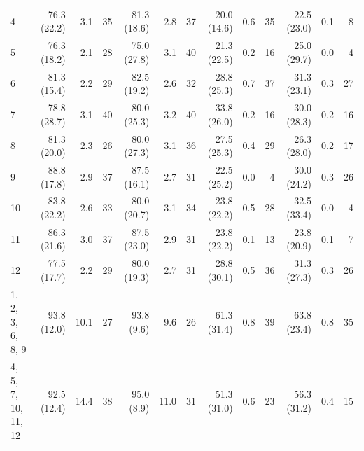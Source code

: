 \begin{table}[bt]
{\begin{tabular}{l|rrr|rrr|rrr|rrr}
        4 & 76.3 (22.2) & 3.1 & 35 &
        81.3 (18.6) & 2.8 & 37 &
        20.0 (14.6) & 0.6 & 35 &
        22.5 (23.0) & 0.1 & 8 \\
        
        5 & 76.3 (18.2) & 2.1 & 28 &
        75.0 (27.8) & 3.1 & 40 &
        21.3 (22.5) & 0.2 & 16 &
        25.0 (29.7) & 0.0 & 4 \\
        
        6 & 81.3 (15.4) & 2.2 & 29 &
        82.5 (19.2) & 2.6 & 32 &
        28.8 (25.3) & 0.7 & 37 &
        31.3 (23.1) & 0.3 & 27 \\
        
        7 & 78.8 (28.7) & 3.1 & 40 &
        80.0 (25.3) & 3.2 & 40 &
        33.8 (26.0) & 0.2 & 16 &
        30.0 (28.3) & 0.2 & 16 \\
        
        8 & 81.3 (20.0) & 2.3 & 26 &
        80.0 (27.3) & 3.1 & 36 &
        27.5 (25.3) & 0.4 & 29 &
        26.3 (28.0) & 0.2 & 17 \\
        
        9 & 88.8 (17.8) & 2.9 & 37 &
        87.5 (16.1) & 2.7 & 31 &
        22.5 (25.2) & 0.0 & 4 &
        30.0 (24.2) & 0.3 & 26 \\
        
        10 & 83.8 (22.2) & 2.6 & 33 &
        80.0 (20.7) & 3.1 & 34 &
        23.8 (22.2) & 0.5 & 28 &
        32.5 (33.4) & 0.0 & 4 \\
        
        11 & 86.3 (21.6) & 3.0 & 37 &
        87.5 (23.0) & 2.9 & 31 &
        23.8 (22.2) & 0.1 & 13 &
        23.8 (20.9) & 0.1 & 7 \\
        
        12 & 77.5 (17.7) & 2.2 & 29 &
        80.0 (19.3) & 2.7 & 31 &
        28.8 (30.1) & 0.5 & 36 &
        31.3 (27.3) & 0.3 & 26 \\
        
        1, 2, 3, 6, 8, 9 & \cellcolor{graybluebrighter} 93.8 (12.0) & 10.1 & 27 &
        93.8 (9.6) & 9.6 & 26 &
        61.3 (31.4) & 0.8 & 39 &
        \cellcolor{graybluebrighter} 63.8 (23.4) & 0.8 & 35 \\
        
        4, 5, 7, 10, 11, 12 & 92.5 (12.4) & 14.4 & 38 &
        \cellcolor{graybluebrighter} 95.0 (8.9) & 11.0 & 31 &
        51.3 (31.0) & 0.6 & 23 &
        56.3 (31.2) & 0.4 & 15 \\
        

\end{tabular}}
\end{table}
